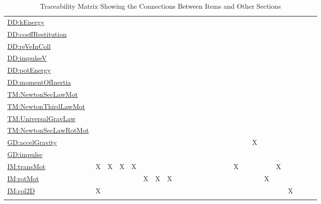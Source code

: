 \documentclass[12pt]{article}
\begin{document}
\begin{longtable}{l l l l l l l l l l l l l l l l l l l l l l l l l}
\\
\hyperref[DD:kEnergy]{DD:kEnergy} &  &  &  &  &  &  &  &  &  &  &  &  &  &  &  &  &  &  &  &  &  &  &  & 
\\
\hyperref[DD:coeffRestitution]{DD:coeffRestitution} &  &  &  &  &  &  &  &  &  &  &  &  &  &  &  &  &  &  &  &  &  &  &  & 
\\
\hyperref[DD:reVeInColl]{DD:reVeInColl} &  &  &  &  &  &  &  &  &  &  &  &  &  &  &  &  &  &  &  &  &  &  &  & 
\\
\hyperref[DD:impulseV]{DD:impulseV} &  &  &  &  &  &  &  &  &  &  &  &  &  &  &  &  &  &  &  &  &  &  &  & 
\\
\hyperref[DD:potEnergy]{DD:potEnergy} &  &  &  &  &  &  &  &  &  &  &  &  &  &  &  &  &  &  &  &  &  &  &  & 
\\
\hyperref[DD:momentOfInertia]{DD:momentOfInertia} &  &  &  &  &  &  &  &  &  &  &  &  &  &  &  &  &  &  &  &  &  &  &  & 
\\
\hyperref[TM:NewtonSecLawMot]{TM:NewtonSecLawMot} &  &  &  &  &  &  &  &  &  &  &  &  &  &  &  &  &  &  &  &  &  &  &  & 
\\
\hyperref[TM:NewtonThirdLawMot]{TM:NewtonThirdLawMot} &  &  &  &  &  &  &  &  &  &  &  &  &  &  &  &  &  &  &  &  &  &  &  & 
\\
\hyperref[TM:UniversalGravLaw]{TM:UniversalGravLaw} &  &  &  &  &  &  &  &  &  &  &  &  &  &  &  &  &  &  &  &  &  &  &  & 
\\
\hyperref[TM:NewtonSecLawRotMot]{TM:NewtonSecLawRotMot} &  &  &  &  &  &  &  &  &  &  &  &  &  &  &  &  &  &  &  &  &  &  &  & 
\\
\hyperref[GD:accelGravity]{GD:accelGravity} &  &  &  &  &  &  &  &  &  &  &  &  &  &  &  &  &  & X &  &  &  &  &  & 
\\
\hyperref[GD:impulse]{GD:impulse} &  &  &  &  &  &  &  &  &  &  &  &  &  &  &  &  &  &  &  &  &  &  &  & 
\\
\hyperref[IM:transMot]{IM:transMot} & X & X & X & X &  &  &  &  &  &  &  &  &  &  &  & X &  &  &  & X &  &  &  & 
\\
\hyperref[IM:rotMot]{IM:rotMot} &  &  &  &  & X & X & X &  &  &  &  &  &  &  &  &  &  &  & X &  &  &  &  & 
\\
\hyperref[IM:col2D]{IM:col2D} & X &  &  &  &  &  &  &  &  &  &  &  &  &  &  &  &  &  &  &  & X &  &  & 
\\
\bottomrule
\caption{Traceability Matrix Showing the Connections Between Items and Other Sections}
\label{Table:TraceMatRefvsRef}
\end{longtable}
\end{document}
